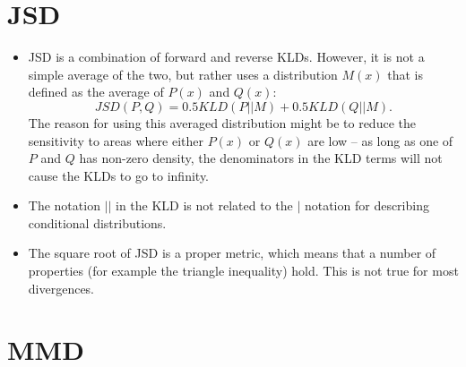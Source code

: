 \documentclass{article}
\begin{document}
\section{JSD}

\begin{itemize}
	\item JSD is a combination of forward and reverse KLDs. However, it is not a simple average of the two, but rather uses a distribution $M(x)$ that is defined as the average of $P(x)$ and $Q(x)$:
	\begin{equation}
	JSD(P,Q) = 0.5 KLD(P||M) + 0.5 KLD(Q||M).
	\end{equation}
	The reason for using this averaged distribution might be to reduce the sensitivity to areas where either $P(x)$ or $Q(x)$ are low -- as long as one of $P$ and $Q$ has non-zero density, the denominators in the KLD terms will not cause the KLDs to go to infinity.
	\item The notation $||$ in the KLD is not related to the $|$ notation for describing conditional distributions.
	\item The square root of JSD is a proper metric, which means that a number of properties (for example the triangle inequality) hold. This is not true for most divergences. 
\end{itemize}

\section{MMD}
\end{document}
